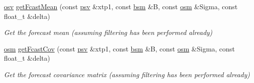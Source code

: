 \begin{DoxyCompactItemize}
\hyperlink{classmultivGamFilter_a34e62f4c6f1de388b86e6106f249cef8}{osv} \hyperlink{classmultivGamFilter_a6f1387050ad08e7aecececb9cd8eeb71}{get\+Fcast\+Mean} (const \hyperlink{classmultivGamFilter_a396935d27512187b9109a70ba04c6abf}{psv} \&xtp1, const \hyperlink{classmultivGamFilter_a48015c1ef68e2d0a704306b56378417d}{bsm} \&B, const \hyperlink{classmultivGamFilter_af55e5c995ab517331ce05dd7ca4f1781}{osm} \&Sigma, const float\+\_\+t \&delta)
\begin{DoxyCompactList}\small\item\em Get the forecast mean (assuming filtering has been performed already) \end{DoxyCompactList}\item 
\hyperlink{classmultivGamFilter_af55e5c995ab517331ce05dd7ca4f1781}{osm} \hyperlink{classmultivGamFilter_a5cdc2917399fed956b44f69002cae8c3}{get\+Fcast\+Cov} (const \hyperlink{classmultivGamFilter_a396935d27512187b9109a70ba04c6abf}{psv} \&xtp1, const \hyperlink{classmultivGamFilter_a48015c1ef68e2d0a704306b56378417d}{bsm} \&B, const \hyperlink{classmultivGamFilter_af55e5c995ab517331ce05dd7ca4f1781}{osm} \&Sigma, const float\+\_\+t \&delta)
\begin{DoxyCompactList}\small\item\em Get the forecast covariance matrix (assuming filtering has been performed already) \end{DoxyCompactList}\end{DoxyCompactItemize}
